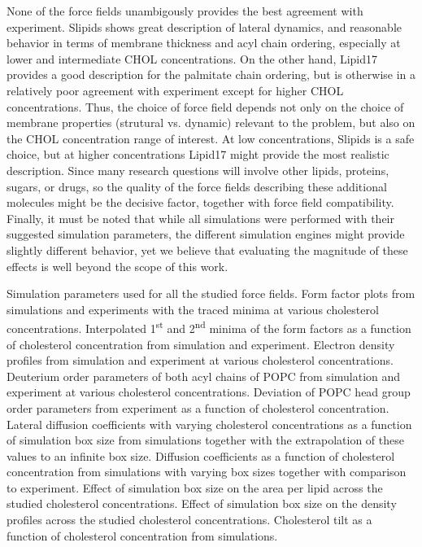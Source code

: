 \documentclass[journal=jctcce]{achemso}
\begin{document}
None of the force fields unambigously provides the best agreement with experiment. Slipids shows great description of lateral dynamics, and reasonable behavior in terms of membrane thickness and acyl chain ordering, especially at lower and intermediate CHOL concentrations. On the other hand, Lipid17 provides a good description for the palmitate chain ordering, but is otherwise in a relatively poor agreement with experiment except for higher CHOL concentrations. Thus, the choice of force field depends not only on the choice of membrane properties (strutural vs. dynamic) relevant to the problem, but also on the CHOL concentration range of interest. At low concentrations, Slipids is a safe choice, but at higher concentrations Lipid17 might provide the most realistic description. Since many research questions will involve other lipids, proteins, sugars, or drugs, so the quality of the force fields describing these additional molecules might be the decisive factor, together with force field compatibility. Finally, it must be noted that while all simulations were performed with their suggested simulation parameters, the different simulation engines might provide slightly different behavior, yet we believe that evaluating the magnitude of these effects is well beyond the scope of this work.

\begin{suppinfo}
Simulation parameters used for all the studied force fields.
%
Form factor plots from simulations and experiments with the traced minima at various cholesterol concentrations.
%
Interpolated 1\textsuperscript{st} and 2\textsuperscript{nd} minima of the form factors as a function of cholesterol concentration from simulation and experiment.
%
Electron density profiles from simulation and experiment at various cholesterol concentrations.
%
Deuterium order parameters of both acyl chains of POPC from simulation and experiment at various cholesterol concentrations.
%
Deviation of POPC head group order parameters from experiment as a function of cholesterol concentration.
%
Lateral diffusion coefficients with varying cholesterol concentrations as a function of simulation box size from simulations together with the extrapolation of these values to an infinite box size.
%
Diffusion coefficients as a function of cholesterol concentration from simulations with varying box sizes together with comparison to experiment.
%
Effect of simulation box size on the area per lipid across the studied cholesterol concentrations.
%
Effect of simulation box size on the density profiles across the studied cholesterol concentrations.
%
Cholesterol tilt as a function of cholesterol concentration from simulations.
\end{suppinfo}
\end{document}
